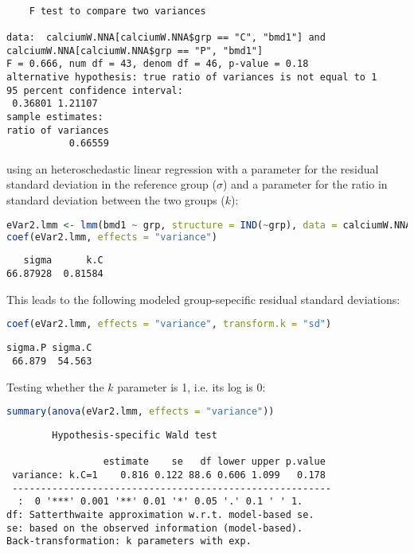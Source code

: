 \documentclass[12pt]{article}
\begin{document}
\label{}
\begin{verbatim}

	F test to compare two variances

data:  calciumW.NNA[calciumW.NNA$grp == "C", "bmd1"] and calciumW.NNA[calciumW.NNA$grp == "P", "bmd1"]
F = 0.666, num df = 43, denom df = 46, p-value = 0.18
alternative hypothesis: true ratio of variances is not equal to 1
95 percent confidence interval:
 0.36801 1.21107
sample estimates:
ratio of variances 
           0.66559
\end{verbatim}

using an heteroschedastic linear regression with a parameter for the
residual standard deviation in the reference group (\(\sigma\)) and a
parameter for the ratio in standard deviation between the two groups
(\(k\)):
\begin{lstlisting}[language=r,numbers=none]
eVar2.lmm <- lmm(bmd1 ~ grp, structure = IND(~grp), data = calciumW.NNA)
coef(eVar2.lmm, effects = "variance")     
\end{lstlisting}

\label{}
\begin{verbatim}
   sigma      k.C 
66.87928  0.81584
\end{verbatim}


This leads to the following modeled group-sepecific residual standard
deviations:
\begin{lstlisting}[language=r,numbers=none]
coef(eVar2.lmm, effects = "variance", transform.k = "sd")
\end{lstlisting}

\label{}
\begin{verbatim}
sigma.P sigma.C 
 66.879  54.563
\end{verbatim}


Testing whether the \(k\) parameter is 1, i.e. its log is 0:
\begin{lstlisting}[language=r,numbers=none]
summary(anova(eVar2.lmm, effects = "variance"))
\end{lstlisting}

\label{}
\begin{verbatim}
		Hypothesis-specific Wald test 

                 estimate    se   df lower upper p.value  
 variance: k.C=1    0.816 0.122 88.6 0.606 1.099   0.178  
 -------------------------------------------------------- 
  :  0 '***' 0.001 '**' 0.01 '*' 0.05 '.' 0.1 ' ' 1.
df: Satterthwaite approximation w.r.t. model-based se. 
se: based on the observed information (model-based). 
Back-transformation: k parameters with exp.
\end{verbatim}
\end{document}
